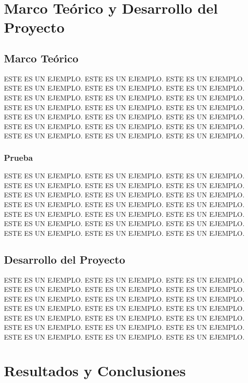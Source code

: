 \documentclass[12pt,spanish]{report}
\begin{document}
\chapter{Marco Te\'orico y Desarrollo del Proyecto}
\newpage

\section{Marco Te\'orico}
ESTE ES UN EJEMPLO. ESTE ES UN EJEMPLO. ESTE ES UN EJEMPLO.
ESTE ES UN EJEMPLO. ESTE ES UN EJEMPLO. ESTE ES UN EJEMPLO.
ESTE ES UN EJEMPLO. ESTE ES UN EJEMPLO. ESTE ES UN EJEMPLO.
ESTE ES UN EJEMPLO. ESTE ES UN EJEMPLO. ESTE ES UN EJEMPLO.
ESTE ES UN EJEMPLO. ESTE ES UN EJEMPLO. ESTE ES UN EJEMPLO.
ESTE ES UN EJEMPLO. ESTE ES UN EJEMPLO. ESTE ES UN EJEMPLO.
ESTE ES UN EJEMPLO. ESTE ES UN EJEMPLO. ESTE ES UN EJEMPLO.

\subsection{Prueba}
ESTE ES UN EJEMPLO. ESTE ES UN EJEMPLO. ESTE ES UN EJEMPLO.
ESTE ES UN EJEMPLO. ESTE ES UN EJEMPLO. ESTE ES UN EJEMPLO.
ESTE ES UN EJEMPLO. ESTE ES UN EJEMPLO. ESTE ES UN EJEMPLO.
ESTE ES UN EJEMPLO. ESTE ES UN EJEMPLO. ESTE ES UN EJEMPLO.
ESTE ES UN EJEMPLO. ESTE ES UN EJEMPLO. ESTE ES UN EJEMPLO.
ESTE ES UN EJEMPLO. ESTE ES UN EJEMPLO. ESTE ES UN EJEMPLO.
ESTE ES UN EJEMPLO. ESTE ES UN EJEMPLO. ESTE ES UN EJEMPLO.

\section{Desarrollo del Proyecto}
ESTE ES UN EJEMPLO. ESTE ES UN EJEMPLO. ESTE ES UN EJEMPLO.
ESTE ES UN EJEMPLO. ESTE ES UN EJEMPLO. ESTE ES UN EJEMPLO.
ESTE ES UN EJEMPLO. ESTE ES UN EJEMPLO. ESTE ES UN EJEMPLO.
ESTE ES UN EJEMPLO. ESTE ES UN EJEMPLO. ESTE ES UN EJEMPLO.
ESTE ES UN EJEMPLO. ESTE ES UN EJEMPLO. ESTE ES UN EJEMPLO.
ESTE ES UN EJEMPLO. ESTE ES UN EJEMPLO. ESTE ES UN EJEMPLO.
ESTE ES UN EJEMPLO. ESTE ES UN EJEMPLO. ESTE ES UN EJEMPLO.
\newpage

\chapter{Resultados y Conclusiones}
\newpage
\end{document}
